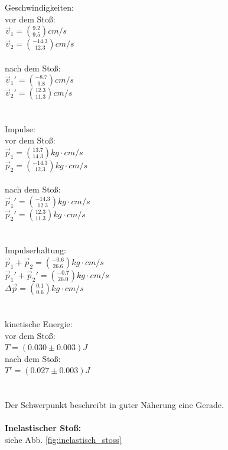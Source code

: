 \documentclass[12pt,a4paper]{article}
\begin{document}
\begin{multicols}{2}
\noindent Geschwindigkeiten:\\
vor dem Stoß:\\
$\vec v_1 =\binom{9.2}{9.5} cm/s$\\
$\vec v_2 =\binom{-14.3}{12.3} cm/s$\\
\\
nach dem Stoß:\\
$\vec v_1' =\binom{-8.7}{9.8} cm/s$\\
$\vec v_2 '=\binom{12.3}{11.3} cm/s$\\
\\
\\
Impulse:\\
vor dem Stoß:\\
$\vec p_1 =\binom{13.7}{14.3} kg\cdot cm/s$\\
$\vec p_2 =\binom{-14.3}{12.3} kg\cdot cm/s$\\
\\
nach dem Stoß:\\
$\vec p_1' =\binom{-14.3}{12.3} kg\cdot cm/s$\\
$\vec p_2 '=\binom{12.3}{11.3} kg\cdot cm/s$\\
\\
\\
Impulserhaltung:\\
$\vec p_1 + \vec p_2 = \binom{-0.6}{26.6} kg\cdot cm/s$\\
$\vec p_1' + \vec p_2' = \binom{-0.7}{26.0} kg\cdot cm/s$\\
$\Delta \vec p =  \binom{0.1}{0.6} kg\cdot cm/s$\\
\\
\\
kinetische Energie:\\
vor dem Stoß:\\
$T = (0.030 \pm 0.003) J$\\
nach dem Stoß:\\
$T'=(0.027 \pm 0.003) J$\\
\\
\\
Der Schwerpunkt beschreibt in guter Näherung eine Gerade.\\
\\
\textbf{Inelastischer Stoß:}\\
siehe Abb. \ref{fig:inelastisch_stoss}


\end{multicols}
\end{document}
